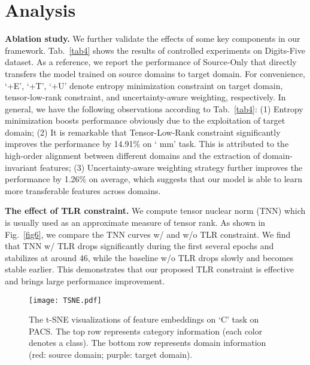 \documentclass[10pt,twocolumn,letterpaper]{article}
\begin{document}
\section{Analysis}
\textbf{Ablation study.} We further validate the effects of some key components in our framework. Tab.~\ref{tab4} shows the results of controlled experiments on Digits-Five dataset. As a reference, we report the performance of Source-Only that directly transfers the model trained on source domains to target domain. For convenience, `+E', `+T', `+U' denote entropy minimization constraint on target domain, tensor-low-rank constraint, and uncertainty-aware weighting, respectively. In general, we have the following observations according to Tab.~\ref{tab4}: (1) Entropy minimization boosts performance obviously due to the exploitation of target domain; (2) It is remarkable that Tensor-Low-Rank constraint significantly improves the performance by 14.91\% on ` mm' task. This is attributed to the high-order alignment between different domains and the extraction of domain-invariant features; (3) Uncertainty-aware weighting strategy further improves the performance by 1.26\% on average, which suggests that our model is able to learn more transferable features across domains.\par

\textbf{The effect of TLR constraint.} We compute tensor nuclear norm (TNN) which is usually used as an approximate measure of tensor rank. As shown in Fig.~\ref{fig6}, we compare the TNN curves w/ and w/o TLR constraint. We find that TNN w/ TLR drops significantly during the first several epochs and stabilizes at around 46, while the baseline w/o TLR drops slowly and becomes stable earlier. This demonstrates that our proposed TLR constraint is effective and brings large performance improvement. 
\begin{figure}
	\centering
	\texttt{[image: TSNE.pdf]}\\
	\caption{The t-SNE visualizations of feature embeddings on `C' task on PACS. The top row represents category information (each color denotes a class). The bottom row represents domain information (red: source domain; purple: target domain).}
	\label{fig3}
	\vspace{-1em}
\end{figure}
\end{document}
